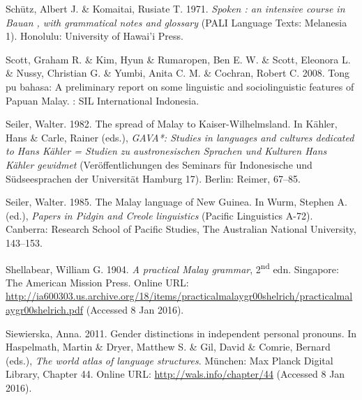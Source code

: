 \begin{styleCitaviBibliographyEntry}
Schütz, Albert J. \& Komaitai, Rusiate T. 1971. \textit{Spoken : an intensive course in Bauan , with grammatical notes and glossary} (PALI Language Texts: Melanesia 1). Honolulu: University of Hawai’i Press.
\end{styleCitaviBibliographyEntry}

\begin{styleCitaviBibliographyEntry}
Scott, Graham R. \& Kim, Hyun \& Rumaropen, Ben E. W. \& Scott, Eleonora L. \& Nussy, Christian G. \& Yumbi, Anita C. M. \& Cochran, Robert C. 2008. Tong pu bahasa: A preliminary report on some linguistic and sociolinguistic features of Papuan Malay. : SIL International Indonesia.
\end{styleCitaviBibliographyEntry}

\begin{styleCitaviBibliographyEntry}
Seiler, Walter. 1982. The spread of Malay to Kaiser-Wilhelmsland. In Kähler, Hans \& Carle, Rainer (eds.), \textit{GAVA*: Studies in  languages and cultures dedicated to Hans Kähler = Studien zu austronesischen Sprachen und Kulturen Hans Kähler gewidmet} (Veröffentlichungen des Seminars für Indonesische und Südseesprachen der Universität Hamburg 17). Berlin: Reimer, 67–85.
\end{styleCitaviBibliographyEntry}

\begin{styleCitaviBibliographyEntry}
Seiler, Walter. 1985. The Malay language of New Guinea. In Wurm, Stephen A. (ed.), \textit{Papers in Pidgin and Creole linguistics} (Pacific Linguistics A-72). Canberra: Research School of Pacific Studies, The Australian National University, 143–153.
\end{styleCitaviBibliographyEntry}

\begin{styleCitaviBibliographyEntry}
Shellabear, William G. 1904. \textit{A practical Malay grammar}, 2\textsuperscript{nd} edn. Singapore: The American Mission Press. Online URL: \url{http://ia600303.us.archive.org/18/items/practicalmalaygr00shelrich/practicalmalaygr00shelrich.pdf} (Accessed 8 Jan 2016).
\end{styleCitaviBibliographyEntry}

\begin{styleCitaviBibliographyEntry}
Siewierska, Anna. 2011. Gender distinctions in independent personal pronouns. In Haspelmath, Martin \& Dryer, Matthew S. \& Gil, David \& Comrie, Bernard (eds.), \textit{The world atlas of language structures}. München: Max Planck Digital Library, Chapter 44. Online URL: \url{http://wals.info/chapter/44} (Accessed 8 Jan 2016).
\end{styleCitaviBibliographyEntry}

